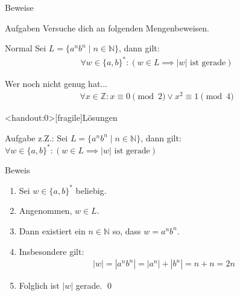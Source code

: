 {
\begin{frame}[fragile]{Beweise}
	\begin{alertblock}{Aufgaben}
		Versuche dich an folgenden Mengenbeweisen.
	\end{alertblock}
	\begin{block}{Normal}
		Sei $L = \{a^nb^n \mid n \in \mathbb{N}\}$, dann gilt:
		\begin{align*}
			\forall w \in \{a, b\}^*: \left(w \in L \implies |w| \text{ ist gerade}\right)
		\end{align*}
	\end{block}
	\begin{block}{Wer noch nicht genug hat...}
		\begin{align*}
			\forall x \in \mathbb{Z}: x \equiv 0 \pmod{2} \vee x^2 \equiv 1 \pmod{4}
		\end{align*}
	\end{block}
\end{frame}
}

{
\begin{frame}<handout:0>[fragile]{Lösungen}
	\begin{alertblock}{Aufgabe}
		z.Z.: Sei $L = \{a^nb^n \mid n \in \mathbb{N}\}$, dann gilt:\\
		$\forall w \in \{a, b\}^*: \left(w \in L \implies |w| \text{ ist gerade}\right)$
	\end{alertblock}
	\begin{alertblock}{Beweis}
		\begin{enumerate}
			\item<1-> Sei $w \in \{a,b\}^*$ beliebig.\\
			\item<2-> Angenommen,  $w \in L$.\\
			\item<3-> Dann existiert ein $n \in \mathbb{N}$ so, dass $w = a^nb^n$.\\
			\item<4-> Insbesondere gilt:
			      \begin{align*}
				      |w| = |a^nb^n| = |a^n| + |b^n| = n+n = 2n
			      \end{align*}
			\item<5-> Folglich ist $|w|$ gerade. \qed
		\end{enumerate}
	\end{alertblock}
\end{frame}
}

